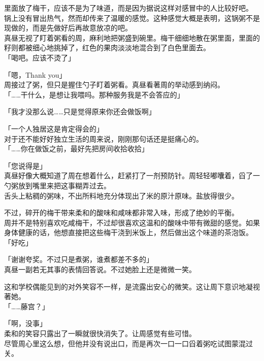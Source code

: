 里面放了梅干，应该不是为了味道，而是因为据说这样对感冒中的人比较好吧。\\

锅上没有冒出热气，然而却传来了温暖的感觉。这种感觉大概是表明，这锅粥不是现做的，而是先做好后再故意放凉的吧。\\

真昼无视了盯着粥看的周，麻利地把粥盛到碗里。梅干细细地散在粥里面，里面的籽则都被细心地挑掉了，红色的果肉淡淡地混合到了白色里面去。\\

「喝吧。应该不烫了」

「嗯，Thank you」\\

周接过了粥，但只是握住勺子盯着粥看。真昼看著周的举动感到纳闷。\\

「……干什么，是想让我喂吗。那种服务我是不会答应的」

「我才没那么说……只是觉得原来你还会做饭啊」

「一个人独居这是肯定得会的」\\

对于还不能好好独立生活的周来说，刚刚那句话还是挺痛心的。\\

「……你在做饭之前，最好先把房间收拾收拾」

「您说得是」\\

真昼好像大概知道了周在想着什么，赶紧打了一剂预防针。周轻轻嘟囔着，舀了一勺粥放到嘴里来把这事糊弄过去。\\

舌头上粘稠的粥味，不出所料地充分体现出了米的原汁原味。盐放得很少。

不过，碎开的梅干带来柔和的酸味和咸味都非常入味，形成了绝妙的平衡。\\

周并不是特别喜欢吃咸梅干，不过却很喜欢这温和的酸味中带有微甜的感觉。如果身体健康的话，他想直接把这些梅干浇到米饭上，然后做出这个味道的茶泡饭。\\

「好吃」

「谢谢夸奖。不过只是煮粥，谁煮都差不多的」\\

真昼一副若无其事的表情回答说。不过她脸上还是微微一笑。

这和学校偶能见到的对外笑容不一样，是流露出安心的微笑。这让周下意识地凝视著她。\\

「……藤宫？」

「啊，没事」\\

柔和的笑容只露出了一瞬就很快消失了。让周感觉有些可惜。\\

尽管周心里这么想，但他并没有说出口，而是再次一口一口舀着粥吃试图蒙混过关。
